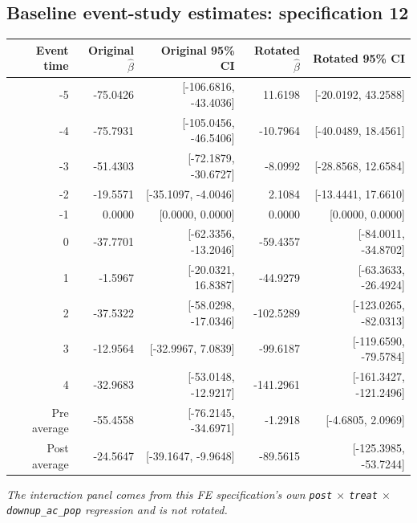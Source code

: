 \documentclass[10pt]{article}
\begin{document}
\subsection*{Baseline event-study estimates: specification 12}
\begin{center}
\scriptsize
\begin{tabular}{r rr rr}
\toprule
Event time & Original $\hat\beta$ & Original 95\% CI & Rotated $\hat\beta$ & Rotated 95\% CI \\
\midrule
-5 & -75.0426 & [-106.6816, -43.4036] & 11.6198 & [-20.0192, 43.2588] \\
-4 & -75.7931 & [-105.0456, -46.5406] & -10.7964 & [-40.0489, 18.4561] \\
-3 & -51.4303 & [-72.1879, -30.6727] & -8.0992 & [-28.8568, 12.6584] \\
-2 & -19.5571 & [-35.1097, -4.0046] & 2.1084 & [-13.4441, 17.6610] \\
-1 & 0.0000 & [0.0000, 0.0000] & 0.0000 & [0.0000, 0.0000] \\
0 & -37.7701 & [-62.3356, -13.2046] & -59.4357 & [-84.0011, -34.8702] \\
1 & -1.5967 & [-20.0321, 16.8387] & -44.9279 & [-63.3633, -26.4924] \\
2 & -37.5322 & [-58.0298, -17.0346] & -102.5289 & [-123.0265, -82.0313] \\
3 & -12.9564 & [-32.9967, 7.0839] & -99.6187 & [-119.6590, -79.5784] \\
4 & -32.9683 & [-53.0148, -12.9217] & -141.2961 & [-161.3427, -121.2496] \\
\midrule
Pre average & -55.4558 & [-76.2145, -34.6971] & -1.2918 & [-4.6805, 2.0969] \\
Post average & -24.5647 & [-39.1647, -9.9648] & -89.5615 & [-125.3985, -53.7244] \\
\bottomrule
\end{tabular}
\end{center}
\medskip
\textit{The interaction panel comes from this FE specification's own \texttt{post} $\times$ \texttt{treat} $\times$ \texttt{downup\_ac\_pop} regression and is not rotated.}
\clearpage
\end{document}
